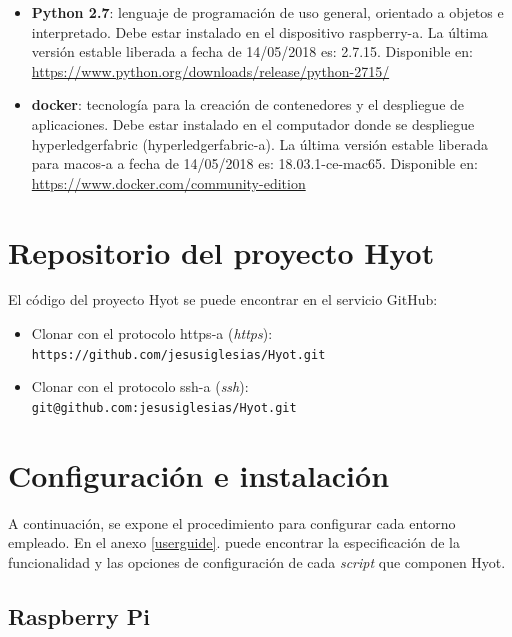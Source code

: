 \documentclass[12pt,a4paper, twoside]{report}
\begin{document}
	\begin{itemize}
		\item \textbf{Python 2.7}: lenguaje de programación de uso general, orientado a objetos e interpretado. Debe estar instalado en el dispositivo \gls{raspberry-a}. La última versión estable liberada a fecha de {\color{red}14/05/2018} es: 2.7.15. Disponible en: \url{https://www.python.org/downloads/release/python-2715/}
		\item \textbf{\gls{docker}}: tecnología para la creación de contenedores y el despliegue de aplicaciones. Debe estar instalado en el computador donde se despliegue \gls{hyperledgerfabric} (\gls{hyperledgerfabric-a}). La última versión estable liberada para \gls{macos-a} a fecha de {\color{red}14/05/2018} es: 18.03.1-ce-mac65. Disponible en: \url{https://www.docker.com/community-edition}
	\end{itemize}
	
	\section{Repositorio del proyecto Hyot}
	
	El código del proyecto Hyot se puede encontrar en el servicio GitHub:
	
		\begin{itemize}
			\item Clonar con el protocolo \gls{https-a} (\textit{\gls{https}}): \newline \texttt{https://github.com/jesusiglesias/Hyot.git}
			\item Clonar con el protocolo \gls{ssh-a} (\textit{\gls{ssh}}): \newline \texttt{git@github.com:jesusiglesias/Hyot.git}
		\end{itemize}
	
	\section{Configuración e instalación}
	
	A continuación, se expone el procedimiento para configurar cada entorno empleado. En el anexo \ref{userguide}.  puede encontrar la especificación de la funcionalidad y las opciones de configuración de cada \textit{\gls{script}} que componen Hyot.
	
	\subsection{Raspberry Pi}
	
\end{document}
